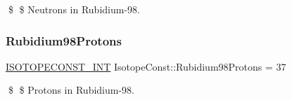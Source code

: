 \$ \$ Neutrons in Rubidium-\/98. \mbox{\label{group___isotope_const-_rubidium-_rb98_gaa921134626a42b00974c78fd82a9dc16}} 
\subsubsection{\texorpdfstring{Rubidium98\+Protons}{Rubidium98Protons}}
{\footnotesize\ttfamily \mbox{\hyperlink{group___isotope_const-_macros_ga5f18360b3e99483a35c32d789e62621c}{I\+S\+O\+T\+O\+P\+E\+C\+O\+N\+S\+T\+\_\+\+I\+NT}} Isotope\+Const\+::\+Rubidium98\+Protons = 37}

\$ \$ Protons in Rubidium-\/98. 